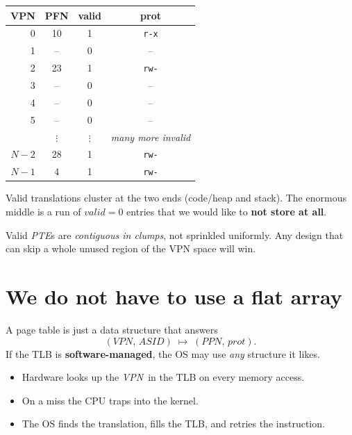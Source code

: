 \documentclass[11pt,a4paper]{article}
\newcommand{\vpn}{\textit{VPN}}
\newcommand{\ppn}{\textit{PPN}}
\newcommand{\pte}{\textit{PTE}}
\begin{document}
\begin{center}
\renewcommand{\arraystretch}{1.15}
\begin{tabular}{rccc}
  \toprule
  \textbf{VPN} & \textbf{PFN} & \textbf{valid} & \textbf{prot} \\
  \midrule
  0  & 10 & 1 & \texttt{r-x} \\
  1  & -- & 0 & -- \\
  2  & 23 & 1 & \texttt{rw-} \\
  3  & -- & 0 & -- \\
  4  & -- & 0 & -- \\
  5  & -- & 0 & -- \\
     & $\vdots$ & $\vdots$ & \textit{many more invalid} \\
  $N{-}2$ & 28 & 1 & \texttt{rw-} \\
  $N{-}1$ & 4  & 1 & \texttt{rw-} \\
  \bottomrule
\end{tabular}
\end{center}

Valid translations cluster at the two ends (code/heap and stack).
The enormous middle is a run of \(\textit{valid}=0\) entries that we
would like to \textbf{not store at all}.

\begin{keybox}[Observation]
Valid \pte s are \emph{contiguous in clumps}, not sprinkled uniformly.
Any design that can skip a whole unused region of the VPN space will
win.
\end{keybox}

\section{We do not have to use a flat array}

A page table is just a data structure that answers
\[
  (\vpn,\,\textit{ASID}) \;\longmapsto\; (\ppn,\,\textit{prot}).
\]
If the TLB is \textbf{software-managed}, the OS may use \emph{any}
structure it likes.

\begin{itemize}
  \item Hardware looks up the \vpn\ in the TLB on every memory access.
  \item On a miss the CPU traps into the kernel.
  \item The OS finds the translation, fills the TLB, and retries the
        instruction.
\end{itemize}
\end{document}
